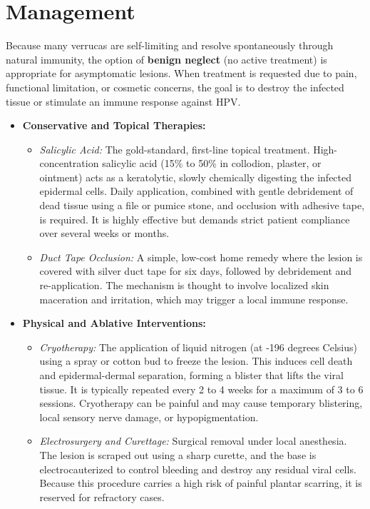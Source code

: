 \section*{Management}
Because many verrucas are self-limiting and resolve spontaneously through natural immunity, the option of \textbf{benign neglect} (no active treatment) is appropriate for asymptomatic lesions. When treatment is requested due to pain, functional limitation, or cosmetic concerns, the goal is to destroy the infected tissue or stimulate an immune response against HPV.
\begin{itemize}
    \item \textbf{Conservative and Topical Therapies:}
    \begin{itemize}
        \item \textit{Salicylic Acid:} The gold-standard, first-line topical treatment. High-concentration salicylic acid (15\% to 50\% in collodion, plaster, or ointment) acts as a keratolytic, slowly chemically digesting the infected epidermal cells. Daily application, combined with gentle debridement of dead tissue using a file or pumice stone, and occlusion with adhesive tape, is required. It is highly effective but demands strict patient compliance over several weeks or months.
        \item \textit{Duct Tape Occlusion:} A simple, low-cost home remedy where the lesion is covered with silver duct tape for six days, followed by debridement and re-application. The mechanism is thought to involve localized skin maceration and irritation, which may trigger a local immune response.
    \end{itemize}
    \item \textbf{Physical and Ablative Interventions:}
    \begin{itemize}
        \item \textit{Cryotherapy:} The application of liquid nitrogen (at -196 degrees Celsius) using a spray or cotton bud to freeze the lesion. This induces cell death and epidermal-dermal separation, forming a blister that lifts the viral tissue. It is typically repeated every 2 to 4 weeks for a maximum of 3 to 6 sessions. Cryotherapy can be painful and may cause temporary blistering, local sensory nerve damage, or hypopigmentation.
        \item \textit{Electrosurgery and Curettage:} Surgical removal under local anesthesia. The lesion is scraped out using a sharp curette, and the base is electrocauterized to control bleeding and destroy any residual viral cells. Because this procedure carries a high risk of painful plantar scarring, it is reserved for refractory cases.

\end{itemize}
\end{itemize}
